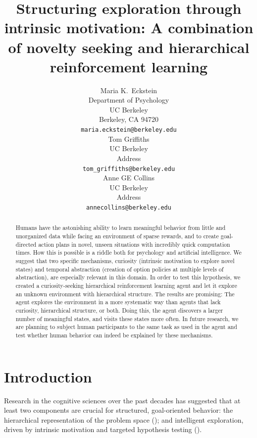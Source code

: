 \documentclass{article}
\title{Structuring exploration through intrinsic motivation: A combination of novelty seeking and hierarchical reinforcement learning}
\author{
  Maria K.~Eckstein \\
  Department of Psychology \\
  UC Berkeley \\
  Berkeley, CA 94720 \\
  \texttt{maria.eckstein@berkeley.edu} \\  
  \And
  Tom Griffiths \\
  UC Berkeley \\
  Address \\
  \texttt{tom_griffiths@berkeley.edu} \\
  \And
  Anne GE Collins \\
  UC Berkeley \\
  Address \\
  \texttt{annecollins@berkeley.edu} \\
}
\begin{document}
\maketitle

\begin{abstract}
    Humans have the astonishing ability to learn meaningful behavior from little and unorganized data while facing an environment of sparse rewards, and to create goal-directed action plans in novel, unseen situations with incredibly quick computation times. How this is possible is a riddle both for psychology and artificial intelligence. We suggest that two specific mechanisms, curiosity (intrinsic motivation to explore novel states) and temporal abstraction (creation of option policies at multiple levels of abstraction), are especially relevant in this domain. In order to test this hypothesis, we created a curiosity-seeking hierarchical reinforcement learning agent and let it explore an unknown environment with hierarchical structure. The results are promising: The agent explores the environment in a more systematic way than agents that lack curiosity, hierarchical structure, or both. Doing this, the agent discovers a larger number of meaningful states, and visits these states more often. In future research, we are planning to subject human participants to the same task as used in the agent and test whether human behavior can indeed be explained by these mechanisms.
\end{abstract}


\section{Introduction}

Research in the cognitive sciences over the past decades has suggested that at least two components are crucial for structured, goal-oriented behavior: the hierarchical representation of the problem space (\cite{collins_reasoning_2012, anderson_act:_1996, miller_integrative_2001, frank_mechanisms_2012, chase_perception_1973, botvinick_model-based_2014}); and intelligent exploration, driven by intrinsic motivation and targeted hypothesis testing (\cite{gopnik_scientific_2012, schmidhuber_formal_2010, lepper_undermining_1973}). 
\end{document}

